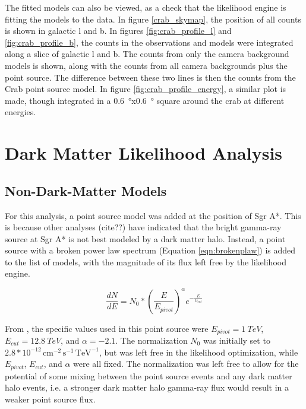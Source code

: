     The fitted models can also be viewed, as a check that the likelihood engine is fitting the models to the data.
    In figure \ref{crab_skymap}, the position of all counts is shown in galactic l and b.
    In figures \ref{fig:crab_profile_l} and \ref{fig:crab_profile_b}, the counts in the observations and models were integrated along a slice of galactic l and b.
    The counts from only the camera background models is shown, along with the counts from all camera backgrounds plus the point source.
    The difference between these two lines is then the counts from the Crab point source model.
    In figure \ref{fig:crab_profile_energy}, a similar plot is made, though integrated in a \SI{0.6}{\degree}x\SI{0.6}{\degree} square around the crab at different energies.

\section{Dark Matter Likelihood Analysis}

  \subsection{Non-Dark-Matter Models}
  For this analysis, a point source model was added at the position of Sgr A*.
  This is because other analyses (cite??) have indicated that the bright gamma-ray source at Sgr A* is not best modeled by a dark matter halo.
  Instead, a point source with a broken power law spectrum (Equation \ref{eqn:brokenplaw}) is added to the list of models, with the magnitude of its flux left free by the likelihood engine.
  
  \begin{equation}\label{eqn:brokenplaw}
    \frac{dN}{dE} = N_{0} * { \left ( \frac{E}{E_{pivot}} \right ) }^{\alpha} {e}^{-\frac{E}{E_{cut}}}
  \end{equation}
  
  From \cite{VeritasGCRidge2015}, the specific values used in this point source were $E_{pivot}=\SI{1}{TeV}$, $E_{cut}=\SI{12.8}{TeV}$, and $\alpha=-2.1$.
  The normalization $N_{0}$ was initially set to $2.8*{10}^{-12}\,\text{cm}^{-2}\,\text{s}^{-1}\,\text{TeV}^{-1}$, but was left free in the likelihood optimization, while $E_{pivot}$, $E_{cut}$, and $\alpha$ were all fixed.
  The normalization was left free to allow for the potential of some mixing between the point source events and any dark matter halo events, i.e. a stronger dark matter halo gamma-ray flux would result in a weaker point source flux.
  
